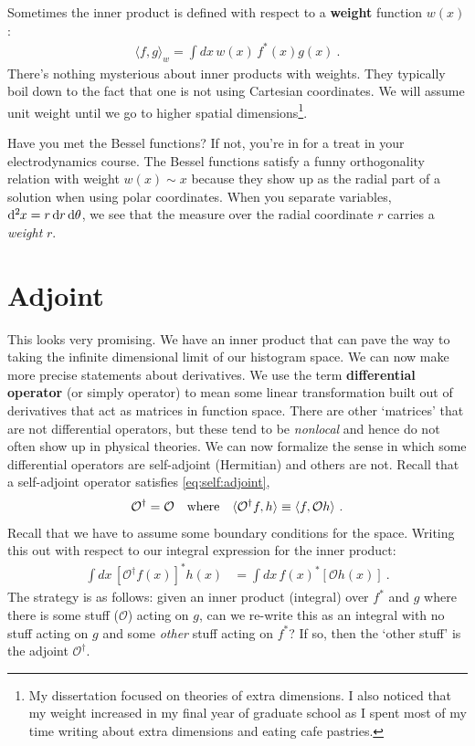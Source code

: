 Sometimes the inner product is defined with respect to a \textbf{weight} function $w(x)$:
\begin{align}
  \langle f,g\rangle_w 
  =
  \int dx\, w(x)\, f^*(x)g(x) \ .
  \label{eq:weighted:inner:product}
\end{align}
There's nothing mysterious about inner products with weights. They typically boil down to the fact that one is not using Cartesian coordinates. We will assume unit weight until we go to higher spatial dimensions\footnote{My dissertation focused on theories of extra dimensions. I also noticed that my weight increased in my final year of graduate school as I spent most of my time writing about extra dimensions and eating cafe pastries.}.
\begin{example}
Have you met the Bessel functions? If not, you're in for a treat in your electrodynamics course. The Bessel functions satisfy a funny orthogonality relation with weight $w(x)\sim x$ because they show up as the radial part of a solution when using polar coordinates. When you separate variables, $\D[2]x = r\D{r}\D{\theta}$, we see that the measure over the radial coordinate $r$ carries a \emph{weight} $r$.
\end{example}

\section{Adjoint}

This looks very promising. We have an inner product that can pave the way to taking the infinite dimensional limit of our histogram space. We can now make more precise statements about derivatives. We use the term \textbf{differential operator} (or simply operator) to mean some linear transformation built out of derivatives that act as matrices in function space. There are other `matrices'  that are not differential operators, but these tend to be \emph{nonlocal} and hence do not often show up in physical theories. We can now formalize the sense in which some differential operators are self-adjoint (Hermitian) and others are not. Recall that a self-adjoint operator satisfies \eqref{eq:self:adjoint},
\begin{align}
    \mathcal O^\dag &= \mathcal O
    &
    \text{where}&
    &
    \la \mathcal O^\dag f,h\ra \equiv \la f, \mathcal O h \ra \ .
\end{align}
Recall that we have to assume some boundary conditions for the space. 
Writing this out with respect to our integral expression for the inner product:
\begin{align}
\int dx \, \left[\mathcal O^\dag f(x)\right]^*  h(x)
&=
  \int dx \, f(x)^* \left[\mathcal O h(x)\right]
   \ .
\end{align}
The strategy is as follows: given an inner product (integral) over $f^*$ and $g$ where there is some stuff ($\mathcal O$) acting on $g$, can we re-write this as an integral with no stuff acting on $g$ and some \emph{other} stuff acting on $f^*$? If so, then the `other stuff' is the adjoint $\mathcal O^\dag$.

